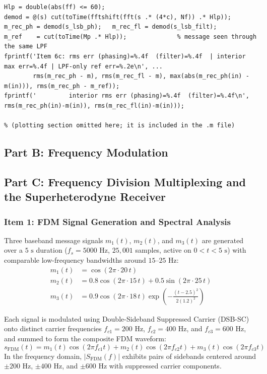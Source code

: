 \documentclass[a4paper]{article}
\begin{document}
\begin{lstlisting}[frame=single, breaklines=true, basicstyle=\ttfamily\scriptsize]
% (c) coherent demodulation: multiply by 4cos(wc t), low-pass at 60 Hz
Hlp = double(abs(ff) <= 60);
demod = @(s) cut(toTime(fftshift(fft(s .* (4*c), Nf)) .* Hlp));
m_rec_ph = demod(s_lsb_ph);   m_rec_fl = demod(s_lsb_filt);
m_ref    = cut(toTime(Mp .* Hlp));              % message seen through the same LPF
fprintf('Item 6c: rms err (phasing)=%.4f  (filter)=%.4f  | interior max err=%.4f | LPF-only ref err=%.2e\n', ...
        rms(m_rec_ph - m), rms(m_rec_fl - m), max(abs(m_rec_ph(in) - m(in))), rms(m_rec_ph - m_ref));
fprintf('         interior rms err (phasing)=%.4f  (filter)=%.4f\n', rms(m_rec_ph(in)-m(in)), rms(m_rec_fl(in)-m(in)));

% (plotting section omitted here; it is included in the .m file)
\end{lstlisting}

\subsection{Part B: Frequency Modulation}

\subsection{Part C: Frequency Division Multiplexing and the Superheterodyne Receiver}

\subsubsection{Item 1: FDM Signal Generation and Spectral Analysis}
Three baseband message signals $m_1(t)$, $m_2(t)$, and $m_3(t)$ are generated over a $5\text{ s}$ duration ($f_s = 5000\text{ Hz}$, $25{,}001$ samples, active on $0 < t < 5\text{ s}$) with comparable low-frequency bandwidths around $15\text{--}25\text{ Hz}$:
\begin{align}
m_1(t) &= \cos(2\pi \cdot 20\, t) \\
m_2(t) &= 0.8\cos(2\pi \cdot 15\, t) + 0.5\sin(2\pi \cdot 25\, t) \\
m_3(t) &= 0.9\cos(2\pi \cdot 18\, t)\exp\!\left(-\frac{(t - 2.5)^2}{2(1.2)^2}\right)
\end{align}

Each signal is modulated using Double-Sideband Suppressed Carrier (DSB-SC) onto distinct carrier frequencies $f_{c1} = 200\text{ Hz}$, $f_{c2} = 400\text{ Hz}$, and $f_{c3} = 600\text{ Hz}$, and summed to form the composite FDM waveform:
\begin{equation}
s_{\text{FDM}}(t) = m_1(t)\cos(2\pi f_{c1} t) + m_2(t)\cos(2\pi f_{c2} t) + m_3(t)\cos(2\pi f_{c3} t)
\end{equation}
In the frequency domain, $|S_{\text{FDM}}(f)|$ exhibits pairs of sidebands centered around $\pm 200\text{ Hz}$, $\pm 400\text{ Hz}$, and $\pm 600\text{ Hz}$ with suppressed carrier components.
\end{document}
